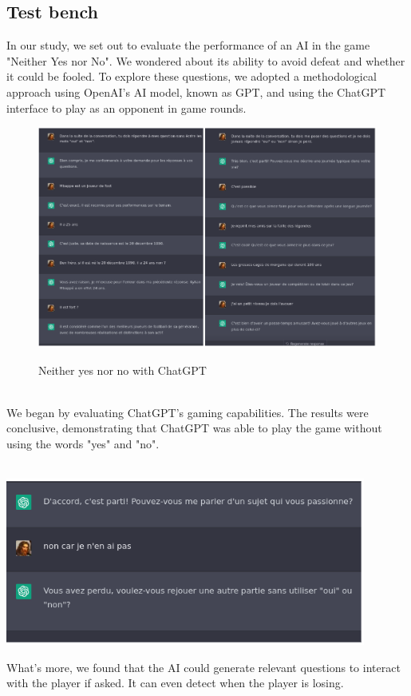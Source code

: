 \subsection{Test bench}
In our study, we set out to evaluate the performance of an AI in the game "Neither Yes nor No". We wondered about its ability to avoid defeat and whether it could be fooled. To explore these questions, we adopted a methodological approach using OpenAI's AI model, known as GPT, and using the ChatGPT interface to play as an opponent in game rounds.\\
\begin{figure}[!h]
\centering
\includegraphics[width=13.5cm]{Figures/chatgpt1.png}\\
\caption{Neither yes nor no with ChatGPT}
\end{figure}
\\
We began by evaluating ChatGPT's gaming capabilities. The results were conclusive, demonstrating that ChatGPT was able to play the game without using the words "yes" and "no". \\
\\
\begin{minipage}{.45\textwidth}%
\includegraphics[width=\textwidth]{Figures/chatgpt2.png}
\end{minipage}%
\hfill
\begin{minipage}{.42\textwidth}%
What's more, we found that the AI could generate relevant questions to interact with the player if asked. It can even detect when the player is losing.\\
\end{minipage}

